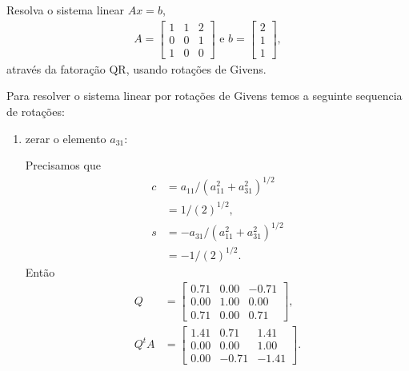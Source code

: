 \begin{questions}
    \question Resolva o sistema linear $A x = b$,
    \begin{align*}
        A = \begin{bmatrix}
            1 & 1 & 2 \\
            0 & 0 & 1 \\
            1 & 0 & 0
        \end{bmatrix} \text{ e } b = \begin{bmatrix}
            2 \\
            1 \\
            1
        \end{bmatrix},
    \end{align*}
    atrav\'{e}s da fatora\c{c}\~{a}o QR, usando rota\c{c}\~{o}es de Givens.
    \begin{solution}
        Para resolver o sistema linear por rota\c{c}\~{o}es de Givens temos a seguinte sequencia de rota\c{c}\~{o}es:
        \begin{enumerate}
            \item zerar o elemento $a_{31}$:

                Precisamos que
                \begin{align*}
                    c &= a_{11} / \left( a_{11}^2 + a_{31}^2 \right)^{1 / 2} \\
                    &= 1 / \left( 2 \right)^{1 / 2}, \\
                    s &= -a_{31} / \left( a_{11}^2 + a_{31}^2 \right)^{1 / 2} \\
                    &= -1 / \left( 2 \right)^{1 / 2}.
                \end{align*}
                Ent\~{a}o
                \begin{align*}
                    Q &= \begin{bmatrix}
                        0.71 & 0.00 & -0.71 \\
                        0.00 & 1.00 & 0.00 \\
                        0.71 & 0.00 & 0.71
                    \end{bmatrix}, \\
                    Q^t A &= \begin{bmatrix}
                        1.41 & 0.71 & 1.41 \\
                        0.00 & 0.00 & 1.00 \\
                        0.00 & -0.71 & -1.41
                    \end{bmatrix}.
                \end{align*}


\end{enumerate}
\end{solution}
\end{questions}
